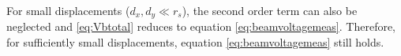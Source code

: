 For small displacements ($d_x,d_y \ll r_s$), the second order term can also be neglected and \ref{eq:Vbtotal} reduces to equation \ref{eq:beamvoltagemeas}. Therefore, for sufficiently small displacements, equation \ref{eq:beamvoltagemeas} still holds.
